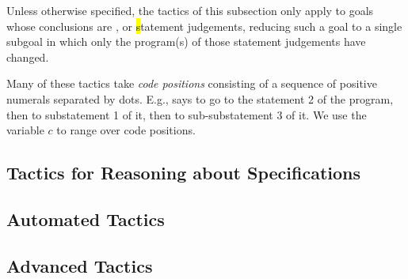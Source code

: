 Unless otherwise specified, the tactics of this subsection only apply
to goals whose conclusions are \prhl, \phl or \hl statement
judgements, reducing such a goal to a single subgoal in which only the
program(s) of those statement judgements have changed.

Many of these tactics take \emph{code positions} consisting of a
sequence of positive numerals separated by dots.  E.g., 
says to go to the statement 2 of the program, then to substatement 1
of it, then to sub-substatement 3 of it. We use the variable $c$ to
range over code positions.















\subsection{Tactics for Reasoning about Specifications}













\subsection{Automated Tactics}
\label{subsec:automatedtactics}





\subsection{Advanced Tactics}
\label{subsec:advancedtactics}




